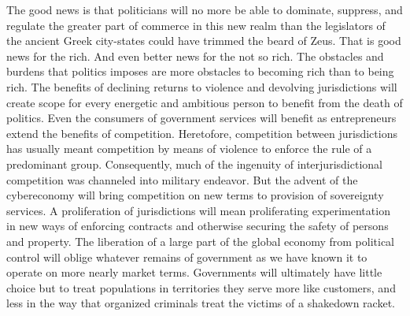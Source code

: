 \begin{paracol}{2}[]
The good news is that politicians will no more be able to dominate, suppress, and regulate the greater part of commerce in this new realm than the legislators of the ancient Greek city-states could have trimmed the beard of Zeus. That is good news for the rich. And even better news for the not so rich. The obstacles and burdens that politics imposes are more obstacles to becoming rich than to being rich.    The benefits of declining returns to violence and devolving jurisdictions will create scope for every energetic and ambitious person to benefit from the death of politics. Even the consumers of government services will benefit as entrepreneurs extend the benefits of competition. Heretofore, competition between jurisdictions has usually meant competition by means of violence to enforce the rule of a predominant group. Consequently, much of the ingenuity of interjurisdictional competition was channeled into military endeavor. But the advent of the cybereconomy will bring competition on new terms to provision of sovereignty services. A proliferation of jurisdictions will mean proliferating experimentation in new ways of enforcing contracts and otherwise securing the safety of persons and property. The liberation of a large part of the global economy from political control will oblige whatever remains of government as we have known it to operate on more nearly market terms. Governments will ultimately have little choice but to treat populations in territories they serve more like customers, and less in the way that organized criminals treat the victims of a shakedown racket.
\end{paracol}

